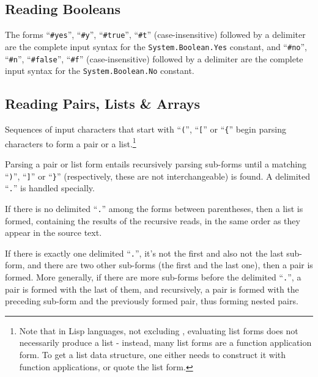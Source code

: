 




\subsection{Reading Booleans}
\label{subsec:aml-base-lang-reader-booleans}

The forms ``\lstinline!#yes!'', ``\lstinline!#y!'', ``\lstinline!#true!'', ``\lstinline!#t!'' (case-insensitive) followed by a delimiter are the complete input syntax for the \lstinline!System.Boolean.Yes! constant, and ``\lstinline!#no!'', ``\lstinline!#n!'', ``\lstinline!#false!'', ``\lstinline!#f!'' (case-insensitive) followed by a delimiter are the complete input syntax for the \lstinline!System.Boolean.No! constant.





\subsection{Reading Pairs, Lists \& Arrays}
\label{subsec:aml-base-lang-reader-lists}

Sequences of input characters that start with ``\lstinline!(!'', ``\lstinline![!'' or ``\lstinline!{!'' begin parsing characters to form a pair or a list.\footnote{Note that in Lisp languages, not excluding \AmlBase, evaluating list forms does not necessarily produce a list - instead, many list forms are a function application form. To get a list data structure, one either needs to construct it with function applications, or quote the list form.}

Parsing a pair or list form entails recursively parsing sub-forms until a matching ``\lstinline!)!'', ``\lstinline!]!'' or ``\lstinline!}!'' (respectively, these are not interchangeable) is found. A delimited ``\lstinline!.!'' is handled specially.

If there is no delimited ``\lstinline!.!'' among the forms between parentheses, then a list is formed, containing the results of the recursive reads, in the same order as they appear in the source text.

If there is exactly one delimited ``\lstinline!.!'', it's not the first and also not the last sub-form, and there are two other sub-forms (the first and the last one), then a pair is formed. More generally, if there are more sub-forms before the delimited ``\lstinline!.!'', a pair is formed with the last of them, and recursively, a pair is formed with the preceding sub-form and the previously formed pair, thus forming nested pairs.

